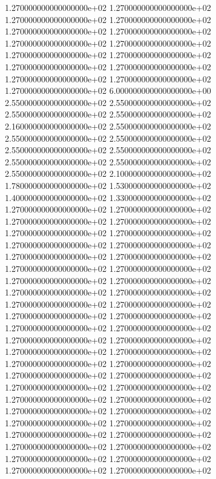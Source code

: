 1.270000000000000000e+02 1.270000000000000000e+02 1.270000000000000000e+02 1.270000000000000000e+02 1.270000000000000000e+02 1.270000000000000000e+02 1.270000000000000000e+02 1.270000000000000000e+02 1.270000000000000000e+02 1.270000000000000000e+02 1.270000000000000000e+02 1.270000000000000000e+02 1.270000000000000000e+02 1.270000000000000000e+02 1.270000000000000000e+02 6.000000000000000000e+00 2.550000000000000000e+02 2.550000000000000000e+02 2.550000000000000000e+02 2.550000000000000000e+02 2.160000000000000000e+02 2.550000000000000000e+02 2.550000000000000000e+02 2.550000000000000000e+02 2.550000000000000000e+02 2.550000000000000000e+02 2.550000000000000000e+02 2.550000000000000000e+02 2.550000000000000000e+02 2.100000000000000000e+02 1.780000000000000000e+02 1.530000000000000000e+02 1.400000000000000000e+02 1.330000000000000000e+02 1.270000000000000000e+02 1.270000000000000000e+02 1.270000000000000000e+02 1.270000000000000000e+02 1.270000000000000000e+02 1.270000000000000000e+02 1.270000000000000000e+02 1.270000000000000000e+02 1.270000000000000000e+02 1.270000000000000000e+02 1.270000000000000000e+02 1.270000000000000000e+02 1.270000000000000000e+02 1.270000000000000000e+02 1.270000000000000000e+02 1.270000000000000000e+02 1.270000000000000000e+02 1.270000000000000000e+02 1.270000000000000000e+02 1.270000000000000000e+02 1.270000000000000000e+02 1.270000000000000000e+02 1.270000000000000000e+02 1.270000000000000000e+02 1.270000000000000000e+02 1.270000000000000000e+02 1.270000000000000000e+02 1.270000000000000000e+02 1.270000000000000000e+02 1.270000000000000000e+02 1.270000000000000000e+02 1.270000000000000000e+02 1.270000000000000000e+02 1.270000000000000000e+02 1.270000000000000000e+02 1.270000000000000000e+02 1.270000000000000000e+02 1.270000000000000000e+02 1.270000000000000000e+02 1.270000000000000000e+02 1.270000000000000000e+02 1.270000000000000000e+02 1.270000000000000000e+02 1.270000000000000000e+02 1.270000000000000000e+02 1.270000000000000000e+02
